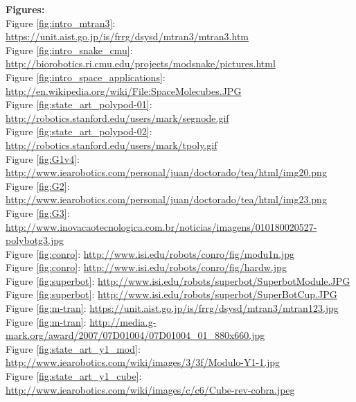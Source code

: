 \noindent
{\Large \textbf{Figures:}}\\

\noindent
Figure \ref{fig:intro_mtran3}: \url{https://unit.aist.go.jp/is/frrg/dsysd/mtran3/mtran3.htm}\\
Figure \ref{fig:intro_snake_cmu}: \url{http://biorobotics.ri.cmu.edu/projects/modsnake/pictures.html}\\
Figure \ref{fig:intro_space_applications}: \url{http://en.wikipedia.org/wiki/File:SpaceMolecubes.JPG}\\

\noindent
Figure \ref{fig:state_art_polypod-01}: \url{http://robotics.stanford.edu/users/mark/segnode.gif}\\
Figure \ref{fig:state_art_polypod-02}: \url{http://robotics.stanford.edu/users/mark/tpoly.gif}\\
Figure \ref{fig:G1v4}: \url{http://www.iearobotics.com/personal/juan/doctorado/tea/html/img20.png}\\
Figure \ref{fig:G2}: \url{http://www.iearobotics.com/personal/juan/doctorado/tea/html/img23.png}\\
Figure \ref{fig:G3}: \url{http://www.inovacaotecnologica.com.br/noticias/imagens/010180020527-polybotg3.jpg}\\
Figure \ref{fig:conro}: \url{http://www.isi.edu/robots/conro/fig/modu1n.jpg}\\
Figure \ref{fig:conro}: \url{http://www.isi.edu/robots/conro/fig/hardw.jpg}\\
Figure \ref{fig:superbot}: \url{http://www.isi.edu/robots/superbot/SuperbotModule.JPG}\\
Figure \ref{fig:superbot}: \url{http://www.isi.edu/robots/superbot/SuperBotCup.JPG}\\
Figure \ref{fig:m-tran}: \url{https://unit.aist.go.jp/is/frrg/dsysd/mtran3/mtran123.jpg}\\
Figure \ref{fig:m-tran}: \url{http://media.g-mark.org/award/2007/07D01004/07D01004_01_880x660.jpg}\\
Figure \ref{fig:state_art_y1_mod}: \url{http://www.iearobotics.com/wiki/images/3/3f/Modulo-Y1-1.jpg}\\
Figure \ref{fig:state_art_y1_cube}: \url{http://www.iearobotics.com/wiki/images/c/c6/Cube-rev-cobra.jpeg}\\

